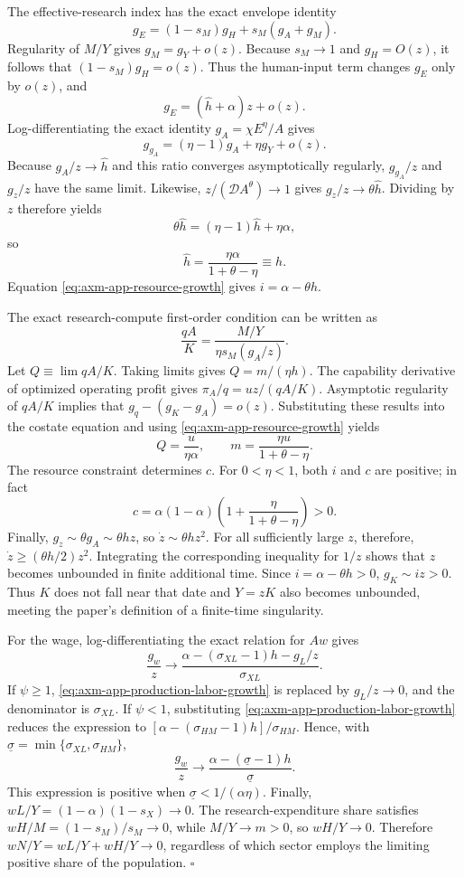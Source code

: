 The effective-research index has the exact envelope identity
\[
 g_E=(1-s_M)g_H+s_M(g_A+g_M).
\]
Regularity of \(M/Y\) gives \(g_M=g_Y+o(z)\). Because \(s_M\to1\) and
\(g_H=O(z)\), it follows that
\((1-s_M)g_H=o(z)\). Thus the human-input term changes \(g_E\) only by
\(o(z)\), and
\[
 g_E=(\widehat h+\alpha)z+o(z).
\]
Log-differentiating the exact identity \(g_A=\chi E^\eta/A\) gives
\[
 g_{g_A}=(\eta-1)g_A+\eta g_Y+o(z).
\]
Because \(g_A/z\to\widehat h\) and this ratio converges asymptotically regularly,
\(g_{g_A}/z\) and \(g_z/z\) have the same limit. Likewise,
\(z/(\mathcal D A^\theta)\to1\) gives
\(g_z/z\to\theta\widehat h\). Dividing by \(z\)
therefore yields
\[
 \theta\widehat h=(\eta-1)\widehat h+\eta\alpha,
\]
so
\[
 \widehat h=\frac{\eta\alpha}{1+\theta-\eta}\equiv h.
\]
Equation \eqref{eq:axm-app-resource-growth} gives \(i=\alpha-\theta h\).

The exact research-compute first-order condition can be written as
\[
 \frac{qA}{K}=\frac{M/Y}{\eta s_M(g_A/z)}.
\]
Let \(Q\equiv\lim qA/K\). Taking limits gives \(Q=m/(\eta h)\). The capability
derivative of optimized operating profit gives \(\pi_A/q=uz/(qA/K)\).
Asymptotic regularity of \(qA/K\) implies that
\(g_q-(g_K-g_A)=o(z)\). Substituting these results into the costate equation and using
\eqref{eq:axm-app-resource-growth} yields
\[
 Q=\frac{u}{\eta\alpha},
 \qquad
 m=\frac{\eta u}{1+\theta-\eta}.
\]
The resource constraint determines \(c\). For \(0<\eta<1\), both \(i\) and \(c\)
are positive; in fact
\[
 c=\alpha(1-\alpha)
 \left(1+\frac{\eta}{1+\theta-\eta}\right)>0.
\]
Finally, \(g_z\sim\theta g_A\sim\theta hz\), so
\(\dot z\sim\theta hz^2\). For all sufficiently large \(z\), therefore,
\(\dot z\geq(\theta h/2)z^2\). Integrating the corresponding inequality for
\(1/z\) shows that \(z\) becomes unbounded in finite additional time. Since
\(i=\alpha-\theta h>0\), \(g_K\sim iz>0\). Thus \(K\) does not fall near that
date and \(Y=zK\) also becomes unbounded, meeting the paper's definition of a
finite-time singularity.

For the wage, log-differentiating the exact relation for \(Aw\) gives
\[
 \frac{g_w}{z}
 \to\frac{\alpha-(\sigma_{XL}-1)h-g_L/z}{\sigma_{XL}}.
\]
If \(\psi\geq1\), \eqref{eq:axm-app-production-labor-growth} is replaced by
\(g_L/z\to0\), and the denominator is \(\sigma_{XL}\). If \(\psi<1\),
substituting \eqref{eq:axm-app-production-labor-growth} reduces the expression
to \([\alpha-(\sigma_{HM}-1)h]/\sigma_{HM}\). Hence, with
\(\underline\sigma=\min\{\sigma_{XL},\sigma_{HM}\}\),
\[
 \frac{g_w}{z}\to
 \frac{\alpha-(\underline\sigma-1)h}{\underline\sigma}.
\]
This expression is positive when
\(\underline\sigma<1/(\alpha\eta)\). Finally,
\(wL/Y=(1-\alpha)(1-s_X)\to0\). The research-expenditure share satisfies
\(wH/M=(1-s_M)/s_M\to0\), while \(M/Y\to m>0\), so \(wH/Y\to0\).
Therefore \(wN/Y=wL/Y+wH/Y\to0\), regardless of which sector employs the
limiting positive share of the population. \(\square\)

